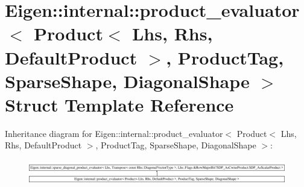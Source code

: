 \hypertarget{struct_eigen_1_1internal_1_1product__evaluator_3_01_product_3_01_lhs_00_01_rhs_00_01_default_prod80b2bd6031901e266d576d7eb3e9735}{}\section{Eigen\+::internal\+::product\+\_\+evaluator$<$ Product$<$ Lhs, Rhs, Default\+Product $>$, Product\+Tag, Sparse\+Shape, Diagonal\+Shape $>$ Struct Template Reference}
\label{struct_eigen_1_1internal_1_1product__evaluator_3_01_product_3_01_lhs_00_01_rhs_00_01_default_prod80b2bd6031901e266d576d7eb3e9735}
Inheritance diagram for Eigen\+::internal\+::product\+\_\+evaluator$<$ Product$<$ Lhs, Rhs, Default\+Product $>$, Product\+Tag, Sparse\+Shape, Diagonal\+Shape $>$\+:\begin{figure}[H]
\begin{center}
\leavevmode
\includegraphics[height=1.080039cm]{struct_eigen_1_1internal_1_1product__evaluator_3_01_product_3_01_lhs_00_01_rhs_00_01_default_prod80b2bd6031901e266d576d7eb3e9735}
\end{center}
\end{figure}
